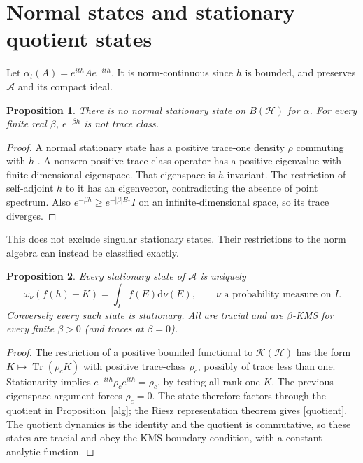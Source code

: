 \documentclass[11pt]{article}
\newcommand{\HH}{\mathcal H}
\newcommand{\Alg}{\mathcal A}
\newcommand{\CC}{\mathcal K(\HH)}
\newcommand{\Tr}{\operatorname{Tr}}
\newcommand{\dd}{\mathrm d}
\newtheorem{proposition}{Proposition}
\begin{document}
\newpage
\section{Normal states and stationary quotient states}
Let $\alpha_t(A)=e^{ith}Ae^{-ith}$. It is norm-continuous since
$h$ is bounded, and preserves $\Alg$ and its compact ideal.

\begin{proposition}\label{normal}
There is no normal stationary state on $B(\HH)$ for $\alpha$.
For every finite real $\beta$, $e^{-\beta h}$ is not trace class.
\end{proposition}
\begin{proof}
A normal stationary state has a positive trace-one density $\rho$
commuting with $h$ \cite{D}. A nonzero positive trace-class operator
has a positive eigenvalue with finite-dimensional eigenspace.
That eigenspace is $h$-invariant. The restriction of self-adjoint
$h$ to it has an eigenvector, contradicting the absence of point
spectrum. Also $e^{-\beta h}\ge e^{-|\beta|E_*}I$ on an
infinite-dimensional space, so its trace diverges.
\end{proof}

This does not exclude singular stationary states. Their restrictions
to the norm algebra can instead be classified exactly.
\begin{proposition}\label{states}
Every stationary state of $\Alg$ is uniquely
\begin{equation}\label{quotient}
 \omega_\nu(f(h)+K)=\int_I f(E)\dd\nu(E),
 \qquad \nu\text{ a probability measure on }I.
\end{equation}
Conversely every such state is stationary. All are tracial and
are $\beta$-KMS for every finite $\beta>0$ (and traces at $\beta=0$).
\end{proposition}
\begin{proof}
The restriction of a positive bounded functional to $\CC$ has
the form $K\mapsto\Tr(\rho_cK)$ with positive trace-class $\rho_c$,
possibly of trace less than one. Stationarity implies
$e^{-ith}\rho_c e^{ith}=\rho_c$, by testing all rank-one $K$.
The previous eigenspace argument forces $\rho_c=0$.
The state therefore factors through the quotient in
Proposition~\ref{alg}; the Riesz representation theorem gives
\eqref{quotient}. The quotient dynamics is the identity and the
quotient is commutative, so these states are tracial and obey
the KMS boundary condition, with a constant analytic function.
\end{proof}
\end{document}
